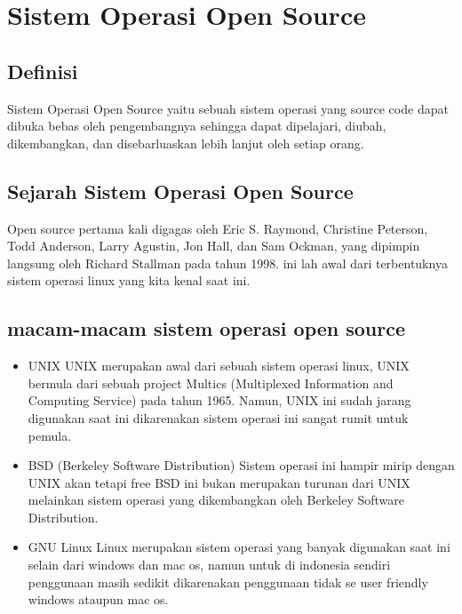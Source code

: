 \section{Sistem Operasi Open Source}
\subsection{Definisi}
	Sistem Operasi Open Source yaitu sebuah sistem operasi yang source code dapat dibuka bebas oleh pengembangnya sehingga dapat dipelajari, diubah, dikembangkan, dan disebarluaskan lebih lanjut oleh setiap orang.

\subsection{Sejarah Sistem Operasi Open Source}
	Open source pertama kali digagas oleh  Eric S. Raymond, Christine Peterson, Todd Anderson, Larry Agustin, Jon Hall, dan Sam Ockman, yang dipimpin langsung oleh Richard Stallman pada tahun 1998. ini lah awal dari terbentuknya sistem operasi linux yang kita kenal saat ini.
\subsection{macam-macam sistem operasi open source}
	\begin{itemize}
		\item UNIX
			UNIX merupakan awal dari sebuah sistem operasi linux, UNIX bermula dari sebuah project Multics (Multiplexed Information and Computing Service) pada tahun 1965. Namun, UNIX ini sudah jarang digunakan saat ini dikarenakan sistem operasi ini sangat rumit untuk pemula.
		\item BSD (Berkeley Software Distribution)
			Sistem operasi ini hampir mirip dengan UNIX akan tetapi free BSD ini  bukan merupakan turunan dari UNIX melainkan sistem operasi yang dikembangkan oleh Berkeley Software Distribution.
		\item GNU Linux
			Linux merupakan sistem operasi yang banyak digunakan saat ini selain dari windows dan mac os, namun untuk di indonesia sendiri penggunaan  masih sedikit dikarenakan penggunaan tidak se user friendly windows ataupun mac os.
\end{itemize}
